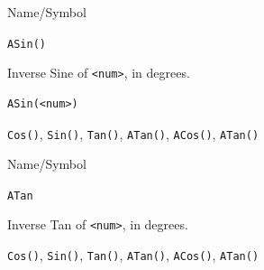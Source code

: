 \begin{desc}{Name/Symbol}

\item[Name/Symbol]  	\verb+ASin()+ 

\item[Description]  	Inverse Sine of \verb+<num>+, in degrees.

\item[Usage]
\begin{verbatim}
ASin(<num>)
\end{verbatim}

\item[Example]	

\item[See Also]    	 \verb+Cos()+, \verb+Sin()+, \verb+Tan()+, \verb+ATan()+, \verb+ACos()+, \verb+ATan()+ 
\end{desc}





\begin{desc}{Name/Symbol}

\item[Name/Symbol]  	\verb+ATan+ 

\item[Description]  	Inverse Tan of \verb+<num>+, in degrees.

\item[Usage]		

\item[Example]	

\item[See Also]    	\verb+Cos()+, \verb+Sin()+, \verb+Tan()+, \verb+ATan()+, \verb+ACos()+, \verb+ATan()+ 
\end{desc}

\vfill
\newpage
{} 
\vfill



